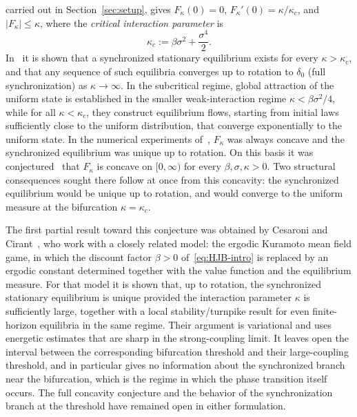 \documentclass{amsart}
\begin{document}
carried out in Section~\ref{sec:setup}, gives
$F_\kappa(0)=0$, $F_\kappa'(0)=\kappa/\kappa_c$, and
$|F_\kappa|\leq\kappa$, where the \emph{critical interaction parameter}
is
\[
\kappa_c:=\beta\sigma^2+\frac{\sigma^4}{2}.
\]
In~\cite{CCS} it is shown that a synchronized stationary equilibrium
exists for every $\kappa>\kappa_c$, and that any sequence of such equilibria converges
up to rotation to $\delta_0$ (full synchronization) as
$\kappa\to\infty$. In the subcritical regime, global attraction of the uniform state is established
in the smaller weak-interaction regime $\kappa<\beta\sigma^2/4$, while for all
$\kappa<\kappa_c$, they construct equilibrium flows, starting from initial
laws sufficiently close to the uniform distribution, that converge exponentially
to the uniform state. In the numerical experiments of~\cite{CCS},
$F_\kappa$ was always concave and the synchronized equilibrium
was unique up to rotation. On this basis it was
conjectured~\cite[Rem.~7.4]{CCS} that $F_\kappa$ is concave on
$[0,\infty)$ for every $\beta,\sigma,\kappa>0$. Two structural
consequences sought there follow at once from this concavity: the
synchronized equilibrium would be unique up to rotation, and would
converge to the uniform measure at the bifurcation $\kappa=\kappa_c$.

The first partial result toward this conjecture was obtained by
Cesaroni and Cirant~\cite{CesaroniCirant}, who work with a closely
related model:
the ergodic Kuramoto mean field game, in which the discount
factor $\beta>0$ of~\eqref{eq:HJB-intro} is replaced by an ergodic
constant determined together with the value function and the
equilibrium measure. For that model it is shown that, up to rotation,
the synchronized stationary equilibrium is unique provided the
interaction parameter $\kappa$ is sufficiently large, together with a
local stability/turnpike result for even finite-horizon equilibria in
the same regime. Their argument is variational and uses
energetic estimates that are sharp in the strong-coupling limit.
It leaves open the interval between the corresponding bifurcation
threshold and their large-coupling threshold, and in particular gives
no information about the synchronized branch near the bifurcation,
which is the regime in which the phase transition itself occurs. The full concavity conjecture and
the behavior of the synchronization branch at the threshold have
remained open in either formulation. 
\end{document}
